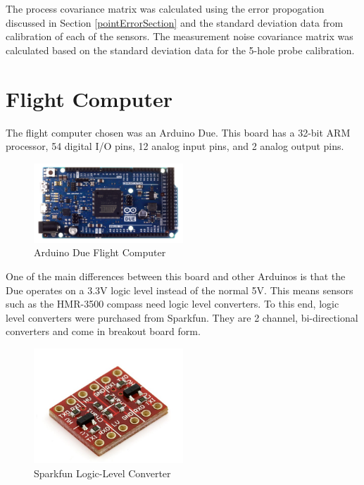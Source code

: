 \documentclass[12pt]{ucthesis}
\begin{document}
The process covariance matrix was calculated using the error propogation discussed in Section \ref{pointErrorSection} and the standard deviation data from calibration of each of the sensors. The measurement noise covariance matrix was calculated based on the standard deviation data for the 5-hole probe calibration.

\section{Flight Computer}
The flight computer chosen was an Arduino Due. This board has a 32-bit ARM processor, 54 digital I/O pins, 12 analog input pins, and 2 analog output pins. 

\begin{figure}[H]
  \caption{Arduino Due Flight Computer} \label{arduinoPicture}
  \centering
    \includegraphics[width=0.5\textwidth]{figures/arduinoDue.jpg}
\end{figure}

One of the main differences between this board and other Arduinos is that the Due operates on a 3.3V logic level instead of the normal 5V. This means sensors such as the HMR-3500 compass need logic level converters. To this end, logic level converters were purchased from Sparkfun. They are 2 channel, bi-directional converters and come in breakout board form.

\begin{figure}[H]
  \caption{Sparkfun Logic-Level Converter} \label{logicLevelConverter}
  \centering
    \includegraphics[width=0.5\textwidth]{figures/logicLevelConverter.jpg}
\end{figure}
\end{document}
